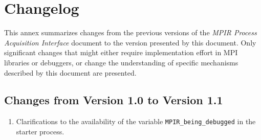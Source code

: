 \chapter{Changelog}

This annex summarizes changes from the previous versions of the \emph{MPIR
Process Acquisition Interface} document to the version presented by this
document. Only significant changes that might either require implementation
effort in MPI libraries or debuggers, or change the understanding of specific
mechanisms described by this document are presented.

\section{Changes from Version 1.0 to Version 1.1}

\begin{enumerate}
    \item Clarifications to the availability of the variable
            \verb+MPIR_being_debugged+ in the starter process.
\end{enumerate}

